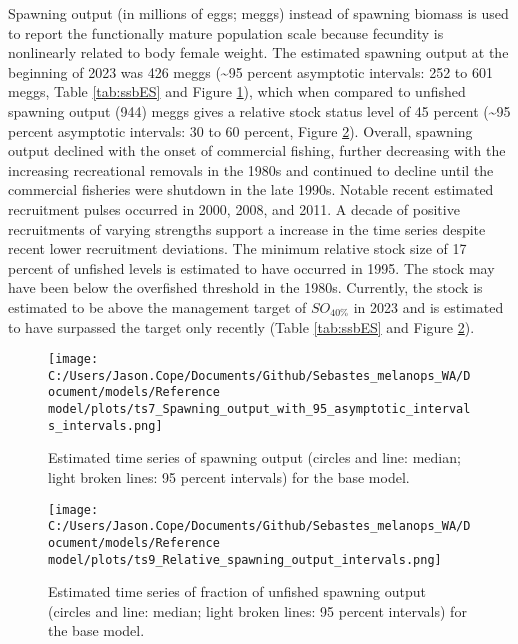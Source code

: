 \documentclass[11pt,
  english,
  letterpaper,
]{article}
\begin{document}
Spawning output (in millions of eggs; meggs) instead of spawning biomass is used to report the functionally mature population scale because fecundity is nonlinearly related to body female weight. The estimated spawning output at the beginning of 2023 was 426 meggs (\textasciitilde95 percent asymptotic intervals: 252 to 601 meggs, Table \ref{tab:ssbES} and Figure \ref{fig:es-ssb}), which when compared to unfished spawning output (944) meggs gives a relative stock status level of 45 percent (\textasciitilde95 percent asymptotic intervals: 30 to 60 percent, Figure \ref{fig:es-depl}). Overall, spawning output declined with the onset of commercial fishing, further decreasing with the increasing recreational removals in the 1980s and continued to decline until the commercial fisheries were shutdown in the late 1990s. Notable recent estimated recruitment pulses occurred in 2000, 2008, and 2011. A decade of positive recruitments of varying strengths support a increase in the time series despite recent lower recruitment deviations. The minimum relative stock size of 17 percent of unfished levels is estimated to have occurred in 1995. The stock may have been below the overfished threshold in the 1980s. Currently, the stock is estimated to be above the management target of \(SO_{40\%}\) in 2023 and is estimated to have surpassed the target only recently (Table \ref{tab:ssbES} and Figure \ref{fig:es-depl}).



\begin{figure}
\centering
\texttt{[image: C:/Users/Jason.Cope/Documents/Github/Sebastes\_melanops\_WA/Document/models/Reference model/plots/ts7\_Spawning\_output\_with\_95\_asymptotic\_intervals\_intervals.png]}
\caption{Estimated time series of spawning output (circles and line: median; light broken lines: 95 percent intervals) for the base model.\label{fig:es-ssb}}
\end{figure}

\begin{figure}
\centering
\texttt{[image: C:/Users/Jason.Cope/Documents/Github/Sebastes\_melanops\_WA/Document/models/Reference model/plots/ts9\_Relative\_spawning\_output\_intervals.png]}
\caption{Estimated time series of fraction of unfished spawning output (circles and line: median; light broken lines: 95 percent intervals) for the base model.\label{fig:es-depl}}
\end{figure}
\end{document}
